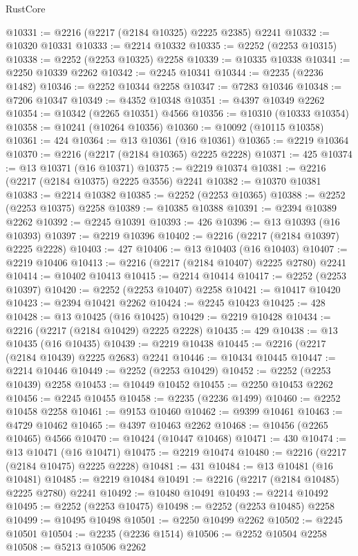 \begin{lexlean}{RustCore}
\begin{coremodule}
@10331 := @2216 (@2217 (@2184 @10325) @2225 @2385) @2241
@10332 := @10320 @10331
@10333 := @2214 @10332
@10335 := @2252 (@2253 @10315)
@10338 := @2252 (@2253 @10325) @2258
@10339 := @10335 @10338
@10341 := @2250 @10339 @2262
@10342 := @2245 @10341
@10344 := @2235 (@2236 @1482)
@10346 := @2252 @10344 @2258
@10347 := @7283 @10346
@10348 := @7206 @10347
@10349 := @4352 @10348
@10351 := @4397 @10349 @2262
@10354 := @10342 (@2265 @10351) @4566
@10356 := @10310 (@10333 @10354)
@10358 := @10241 (@10264 @10356)
@10360 := @10092 (@10115 @10358)
@10361 := 424
@10364 := @13 @10361 (@16 @10361)
@10365 := @2219 @10364
@10370 := @2216 (@2217 (@2184 @10365) @2225 @2228)
@10371 := 425
@10374 := @13 @10371 (@16 @10371)
@10375 := @2219 @10374
@10381 := @2216 (@2217 (@2184 @10375) @2225 @3556) @2241
@10382 := @10370 @10381
@10383 := @2214 @10382
@10385 := @2252 (@2253 @10365)
@10388 := @2252 (@2253 @10375) @2258
@10389 := @10385 @10388
@10391 := @2394 @10389 @2262
@10392 := @2245 @10391
@10393 := 426
@10396 := @13 @10393 (@16 @10393)
@10397 := @2219 @10396
@10402 := @2216 (@2217 (@2184 @10397) @2225 @2228)
@10403 := 427
@10406 := @13 @10403 (@16 @10403)
@10407 := @2219 @10406
@10413 := @2216 (@2217 (@2184 @10407) @2225 @2780) @2241
@10414 := @10402 @10413
@10415 := @2214 @10414
@10417 := @2252 (@2253 @10397)
@10420 := @2252 (@2253 @10407) @2258
@10421 := @10417 @10420
@10423 := @2394 @10421 @2262
@10424 := @2245 @10423
@10425 := 428
@10428 := @13 @10425 (@16 @10425)
@10429 := @2219 @10428
@10434 := @2216 (@2217 (@2184 @10429) @2225 @2228)
@10435 := 429
@10438 := @13 @10435 (@16 @10435)
@10439 := @2219 @10438
@10445 := @2216 (@2217 (@2184 @10439) @2225 @2683) @2241
@10446 := @10434 @10445
@10447 := @2214 @10446
@10449 := @2252 (@2253 @10429)
@10452 := @2252 (@2253 @10439) @2258
@10453 := @10449 @10452
@10455 := @2250 @10453 @2262
@10456 := @2245 @10455
@10458 := @2235 (@2236 @1499)
@10460 := @2252 @10458 @2258
@10461 := @9153 @10460
@10462 := @9399 @10461
@10463 := @4729 @10462
@10465 := @4397 @10463 @2262
@10468 := @10456 (@2265 @10465) @4566
@10470 := @10424 (@10447 @10468)
@10471 := 430
@10474 := @13 @10471 (@16 @10471)
@10475 := @2219 @10474
@10480 := @2216 (@2217 (@2184 @10475) @2225 @2228)
@10481 := 431
@10484 := @13 @10481 (@16 @10481)
@10485 := @2219 @10484
@10491 := @2216 (@2217 (@2184 @10485) @2225 @2780) @2241
@10492 := @10480 @10491
@10493 := @2214 @10492
@10495 := @2252 (@2253 @10475)
@10498 := @2252 (@2253 @10485) @2258
@10499 := @10495 @10498
@10501 := @2250 @10499 @2262
@10502 := @2245 @10501
@10504 := @2235 (@2236 @1514)
@10506 := @2252 @10504 @2258
@10508 := @5213 @10506 @2262

\end{coremodule}
\end{lexlean}
